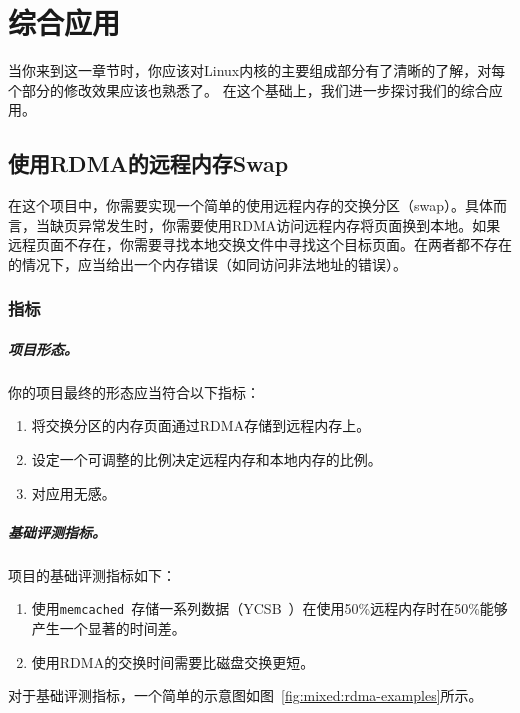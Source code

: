 \chapter{综合应用}
当你来到这一章节时，你应该对Linux内核的主要组成部分有了清晰的了解，对每个部分的修改效果应该也熟悉了。
在这个基础上，我们进一步探讨我们的综合应用。

\section{使用RDMA的远程内存Swap}
在这个项目中，你需要实现一个简单的使用远程内存的交换分区（swap）。具体而言，当缺页异常发生时，你需要使用RDMA访问远程内存将页面换到本地。如果远程页面不存在，你需要寻找本地交换文件中寻找这个目标页面。在两者都不存在的情况下，应当给出一个内存错误（如同访问非法地址的错误）。
\subsection{指标}
\paragraph*{项目形态。}
你的项目最终的形态应当符合以下指标：
\begin{enumerate}
    \item 将交换分区的内存页面通过RDMA存储到远程内存上。
    \item 设定一个可调整的比例决定远程内存和本地内存的比例。
    \item 对应用无感。
\end{enumerate}

\paragraph*{基础评测指标。}
项目的基础评测指标如下：
\begin{enumerate}
    \item 使用\texttt{memcached}~\cite{fitzpatrick2004distributed}存储一系列数据（YCSB~\cite{cooper2010benchmarking}）在使用50\%远程内存时在50\%能够产生一个显著的时间差。
    \item 使用RDMA的交换时间需要比磁盘交换更短。
\end{enumerate}

对于基础评测指标，一个简单的示意图如图~\ref{fig:mixed:rdma-examples}所示。

